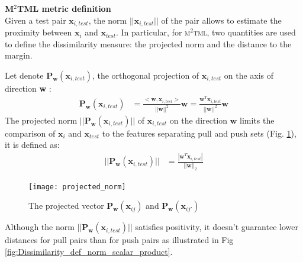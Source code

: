 \noindent \textbf{M$^2$TML metric definition} \\
Given a test pair $\textbf{x}_{i,test}$, the norm $||\textbf{x}_{i,test}||$ of the pair allows to estimate the proximity between $\textbf{x}_{i}$ and $\textbf{x}_{test}$. In particular, for \textsc{m$^2$tml}, two quantities are used to define the dissimilarity measure: the projected norm and the distance to the margin.

\noindent Let denote $\textbf{P}_\textbf{w}(\textbf{x}_{i,test})$, the orthogonal projection of $\textbf{x}_{i,test}$ on the axis of direction \textbf{w} :
\begin{align}
	\textbf{P}_\textbf{w}(\textbf{x}_{i,test}) 
	&= 
	\frac{<\textbf{w},\textbf{x}_{i,test}>}{||\textbf{w}||^2} \textbf{w} = \frac{\textbf{w}^T\textbf{x}_{i,test}}{||\textbf{w}||^2} \textbf{w}
	\label{eq:projected}
\end{align}	
The projected norm $||\textbf{P}_\textbf{w}(\textbf{x}_{i,test})||$ of $\textbf{x}_{i,test}$ on the direction $\textbf{w}$ limits the comparison of $\textbf{x}_{i}$ and $\textbf{x}_{test}$ to the features separating pull and push sets (Fig. \ref{fig:projected_norm}), it is defined as:
\begin{align}
	||\textbf{P}_\textbf{w}(\textbf{x}_{i,test})|| 
	&= 
	\frac{|\textbf{w}^T\textbf{x}_{i,test}|}{||\textbf{w}||_2}
	\label{eq:projected_norm}
\end{align}

\begin{figure}[h!]
	\centering
	\texttt{[image: projected\_norm]}
	\caption{The projected vector $\textbf{P}_\textbf{w}(\textbf{x}_{ij})$ and $\textbf{P}_\textbf{w}(\textbf{x}_{ij'})$}
	\label{fig:projected_norm}
\end{figure}

\noindent Although the norm $||\textbf{P}_\textbf{w}(\textbf{x}_{i,test})||$ satisfies positivity, it doesn’t guarantee lower distances for pull pairs than for push pairs as illustrated in Fig \ref{fig:Dissimilarity_def_norm_scalar_product}. 

